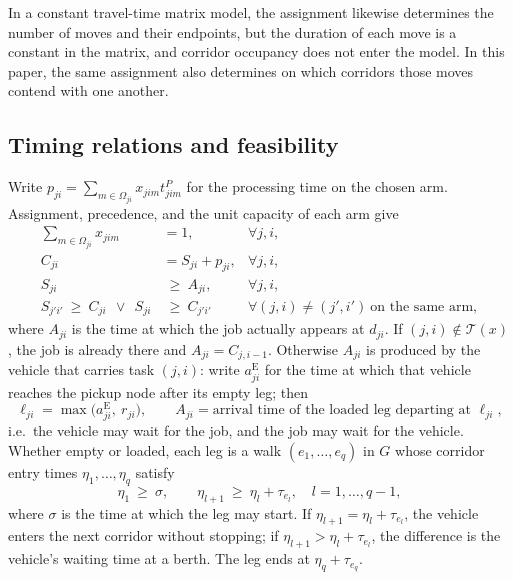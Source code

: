 \documentclass[manuscript,screen,review]{acmart}
\begin{document}
In a constant travel-time matrix model, the assignment likewise determines the number of moves and their endpoints, but the duration of each move is a constant in the matrix, and corridor occupancy does not enter the model.
In this paper, the same assignment also determines on which corridors those moves contend with one another.

\subsection{Timing relations and feasibility}

Write $p_{ji}=\sum_{m\in\Omega_{ji}}x_{jim}t^P_{jim}$ for the processing time on the chosen arm. Assignment, precedence, and
the unit capacity of each arm give
\begin{align}
\sum_{m\in\Omega_{ji}} x_{jim} &= 1, & \forall j,i,
\label{eq:assign}\\
C_{ji} &= S_{ji}+p_{ji}, & \forall j,i,
\label{eq:dur}\\
S_{ji} &\ \ge\ A_{ji}, & \forall j,i,
\label{eq:material}\\
S_{j'i'}\ \ge\ C_{ji}\ \ \vee\ \ S_{ji} &\ \ge\ C_{j'i'}
& \forall (j,i)\neq(j',i')\ \text{on the same arm},
\label{eq:disj}
\end{align}
where $A_{ji}$ is the time at which the job actually appears at $d_{ji}$. If $(j,i)\notin\mathcal{T}(x)$, the job is
already there and $A_{ji}=C_{j,i-1}$. Otherwise $A_{ji}$ is produced by the vehicle that carries task $(j,i)$: write
$a^{\mathrm{E}}_{ji}$ for the time at which that vehicle reaches the pickup node after its empty leg; then
\begin{equation}
\label{eq:load}
\ell_{ji}=\max\bigl(a^{\mathrm{E}}_{ji},\ r_{ji}\bigr),
\qquad
A_{ji}=\text{arrival time of the loaded leg departing at } \ell_{ji},
\end{equation}
i.e.\ the vehicle may wait for the job, and the job may wait for the vehicle. Whether empty or loaded, each leg is a walk
$(e_1,\dots,e_q)$ in $G$ whose corridor entry times $\eta_1,\dots,\eta_q$ satisfy
\begin{equation}
\label{eq:walk}
\eta_1 \ \ge\ \sigma, \qquad
\eta_{l+1}\ \ge\ \eta_l+\tau_{e_l}, \quad l=1,\dots,q-1,
\end{equation}
where $\sigma$ is the time at which the leg may start.
If $\eta_{l+1}=\eta_l+\tau_{e_l}$, the vehicle enters the next corridor without stopping; if $\eta_{l+1}>\eta_l+\tau_{e_l}$, the difference is the vehicle's waiting time at a berth. The leg ends at $\eta_q+\tau_{e_q}$.
\end{document}
